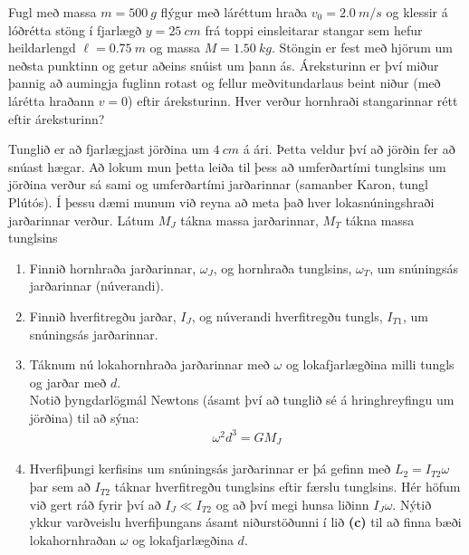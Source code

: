 \begin{enumerate}[label = \textbf{Dæmi \thechapter.\arabic*.}]
\begin{minipage}{\linewidth}
\item Fugl með massa $m = \SI{500}{g}$ flýgur með láréttum hraða $v_0 = \SI{2.0}{m/s}$ og klessir á lóðrétta stöng í fjarlægð $y = \SI{25}{cm}$ frá toppi einsleitarar stangar sem hefur heildarlengd $\ell = \SI{0.75}{m}$ og massa $M = \SI{1.50}{kg}$. Stöngin er fest með hjörum um neðsta punktinn og getur aðeins snúist um þann ás. Áreksturinn er því miður þannig að aumingja fuglinn rotast og fellur meðvitundarlaus beint niður (með lárétta hraðann $v = 0$) eftir áreksturinn. Hver verður hornhraði stangarinnar rétt eftir áreksturinn? 

\end{minipage}

\vspace{0.5cm}

\item Tunglið er að fjarlægjast jörðina um $\SI{4}{cm}$ á ári. Þetta veldur því að jörðin fer að snúast hægar. Að lokum mun þetta leiða til þess að umferðartími tunglsins um jörðina verður sá sami og umferðartími jarðarinnar (samanber Karon, tungl Plútós). Í þessu dæmi munum við reyna að meta það hver lokasnúningshraði jarðarinnar verður. Látum $M_J$ tákna massa jarðarinnar, $M_T$ tákna massa tunglsins

\begin{enumerate}[label = \textbf{(\alph*)}]
    \item Finnið hornhraða jarðarinnar, $\omega_J$, og hornhraða tunglsins, $\omega_T$, um snúningsás jarðarinnar (núverandi).
    
    \item Finnið hverfitregðu jarðar, $I_J$, og núverandi hverfitregðu tungls, $I_{T1}$, um snúningsás jarðarinnar.
    
    \item Táknum nú lokahornhraða jarðarinnar með $\omega$ og lokafjarlægðina milli tungls og jarðar með $d$. \\ Notið þyngdarlögmál Newtons (ásamt því að tunglið sé á hringhreyfingu um jörðina) til að sýna:
    \begin{align*}
        \omega^2 d^3= GM_J
    \end{align*}
    
    \item Hverfiþungi kerfisins um snúningsás jarðarinnar er þá gefinn með $L_2 = I_{T2} \omega$ þar sem að $I_{T2}$ táknar hverfitregðu tunglsins eftir færslu tunglsins. Hér höfum við gert ráð fyrir því að $I_J \ll I_{T2}$ og að því megi hunsa liðinn $I_J\omega$. Nýtið ykkur varðveislu hverfiþungans ásamt niðurstöðunni í lið \textbf{(c)} til að finna bæði lokahornhraðan $\omega$ og lokafjarlægðina $d$.
    

\end{enumerate}
\end{enumerate}
